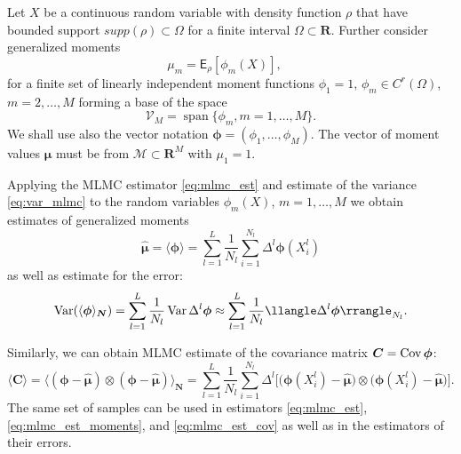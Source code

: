 \documentclass{article}
\def\vc#1{\mathbf{\boldsymbol{#1}}}     %
\def\tn#1{\boldsymbol{#1}}
\def \E{{\mathsf E}}
\def\R{\mathbf{R}}
\def\avg#1{\langle#1\rangle}
\def\var#1{\llangle#1\rrangle}
\def\Var{\mathop{\rm Var}}
\def\Cov{\mathop{\rm Cov}}
\DeclareMathOperator{\Span}{span}
\def\vmu{\vc\mu}
\def\estvmu{{\vc{\hat\mu}}}
\def\vphi{\vc\phi}
\begin{document}
Let $X$ be a continuous random variable with density function $\rho$ that have bounded support
$supp(\rho) \subset \Omega$ for a finite interval $\Omega \subset \R$. Further consider generalized moments
\begin{equation}
    \label{eq:gen_moments}
    \mu_m = \E_{\rho}[\phi_m(X)], \quad 
\end{equation}
for a finite set of linearly independent moment functions $\phi_1=1$, $\phi_m\in C^r(\Omega)$, $m=2,\dots, M$ forming a base of the space
\[
    \mathcal V_M = \Span\{\phi_m, m=1,\dots, M\}.
\] 
We shall use also the vector notation $\vphi = (\phi_1, \dots,\phi_M)$. The vector of moment values
$\vmu$ must be from $\mathcal M \subset \R^M$ with $\mu_1 = 1$.

Applying the MLMC estimator \eqref{eq:mlmc_est} and estimate of the variance \eqref{eq:var_mlmc} 
to the random variables $\phi_m(X)$, $m=1,\dots, M$ we obtain estimates of generalized moments
\begin{equation}
    \label{eq:mlmc_est_moments}
    \estvmu = \avg{\vphi} = \sum_{l=1}^L \frac{1}{N_l} \sum_{i=1}^{N_l} \Delta^l\vphi(X_i^l)
\end{equation}
as well as estimate for the error:
\[
    \Var(\avg{\vphi}_{\vc N}) =  \sum_{l=1}^{L} \frac{1}{N_l} \Var{\Delta^l\vphi} 
    \approx \sum_{l=1}^{L} \frac{1}{N_l} \var{\Delta^l\vphi}_{N_l}.
\]

Similarly, we can obtain MLMC estimate of the covariance matrix $\tn C = \Cov{\vc\phi}$: 
\begin{equation}
    \label{eq:mlmc_est_cov}
    \avg{\tn C} = \avg{(\vphi - \estvmu)\otimes(\vphi - \estvmu)}_{\vc N} = 
    \sum_{l=1}^L \frac{1}{N_l} \sum_{i=1}^{N_l} \Delta^l\Big[ 
    \big(\vphi(X_i^l) - \estvmu\big)\otimes\big(\vphi(X_i^l) - \estvmu\big)\Big].
\end{equation}
The same set of samples can be used in estimators \eqref{eq:mlmc_est}, \eqref{eq:mlmc_est_moments}, and \eqref{eq:mlmc_est_cov} as well as in the estimators of their errors.
\end{document}
